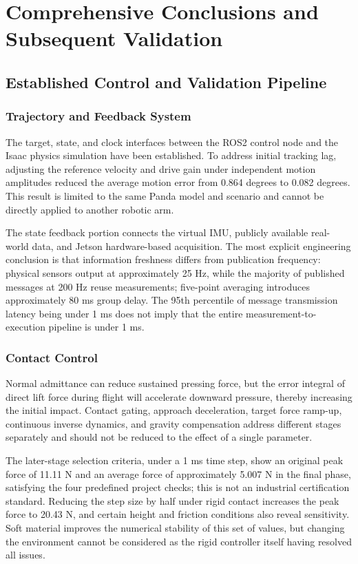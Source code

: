 \chapter{Comprehensive Conclusions and Subsequent Validation}
\section{Established Control and Validation Pipeline}
\subsection{Trajectory and Feedback System}
The target, state, and clock interfaces between the ROS2 control node and the Isaac physics simulation have been established. To address initial tracking lag, adjusting the reference velocity and drive gain under independent motion amplitudes reduced the average motion error from 0.864 degrees to 0.082 degrees. This result is limited to the same Panda model and scenario and cannot be directly applied to another robotic arm.

The state feedback portion connects the virtual IMU, publicly available real-world data, and Jetson hardware-based acquisition. The most explicit engineering conclusion is that information freshness differs from publication frequency: physical sensors output at approximately 25 Hz, while the majority of published messages at 200 Hz reuse measurements; five-point averaging introduces approximately 80 ms group delay. The 95th percentile of message transmission latency being under 1 ms does not imply that the entire measurement-to-execution pipeline is under 1 ms.
\subsection{Contact Control}
Normal admittance can reduce sustained pressing force, but the error integral of direct lift force during flight will accelerate downward pressure, thereby increasing the initial impact. Contact gating, approach deceleration, target force ramp-up, continuous inverse dynamics, and gravity compensation address different stages separately and should not be reduced to the effect of a single parameter.

The later-stage selection criteria, under a 1 ms time step, show an original peak force of 11.11 N and an average force of approximately 5.007 N in the final phase, satisfying the four predefined project checks; this is not an industrial certification standard. Reducing the step size by half under rigid contact increases the peak force to 20.43 N, and certain height and friction conditions also reveal sensitivity. Soft material improves the numerical stability of this set of values, but changing the environment cannot be considered as the rigid controller itself having resolved all issues.
